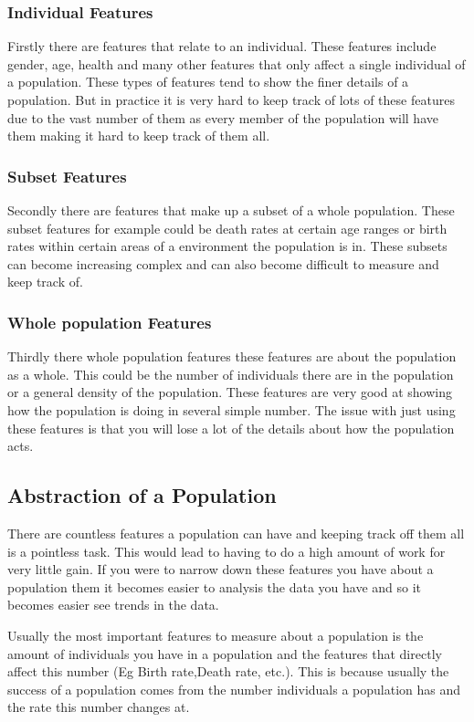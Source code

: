 \documentclass[final]{cmpreport}
\begin{document}
\subsubsection{Individual Features}
Firstly there are features that relate to an individual. These features  include gender, age, health and many other features that only affect a single individual of a population. These types of features tend to show the finer details of a population. But in practice it is very hard to keep track of lots of these features due to the vast number of them as every member of the population will have them making it hard to keep track of them all.

\subsubsection{Subset Features}
Secondly there are features that make up a subset of a whole population. These subset features for example could be death rates at certain age ranges or birth rates within certain areas of a environment the population is in. These subsets can become increasing complex and can also become difficult to measure and keep track of.

\subsubsection{Whole population Features}
Thirdly there whole population features these features are about the population as a whole. This could be the number of individuals there are in the population or a general density of the population. These features are very good at showing how the population is doing in several simple number. The issue with just using these features is that you will lose a lot of the details about how the population acts.

\subsection{Abstraction of a Population}
There are countless features a population can have and keeping track off them all is a pointless task. This would lead to having to do a high amount of work for very little gain. If you were to narrow down these features you have about a population them it becomes easier to analysis the data you have and so it becomes easier see trends in the data. 

Usually the most important features to measure about a population is the amount of individuals you have in a population and the features that directly affect this number (Eg Birth rate,Death rate, etc.). This is because usually the success of a population comes from the number individuals a population has and the rate this number changes at.
\end{document}
